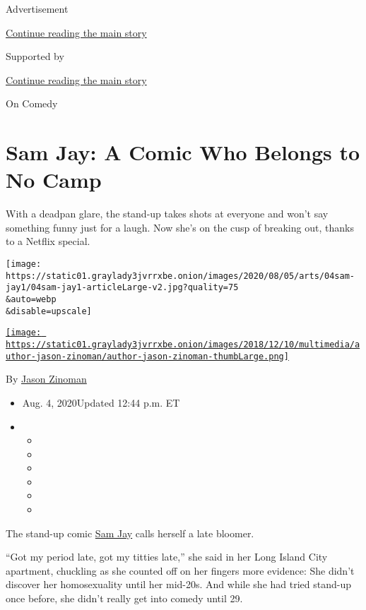 Advertisement

\protect\hyperlink{after-top}{Continue reading the main story}

Supported by

\protect\hyperlink{after-sponsor}{Continue reading the main story}

On Comedy

\hypertarget{sam-jay-a-comic-who-belongs-to-no-camp}{%
\section{Sam Jay: A Comic Who Belongs to No
Camp}\label{sam-jay-a-comic-who-belongs-to-no-camp}}

With a deadpan glare, the stand-up takes shots at everyone and won't say
something funny just for a laugh. Now she's on the cusp of breaking out,
thanks to a Netflix special.

\texttt{[image: https://static01.graylady3jvrrxbe.onion/images/2020/08/05/arts/04sam-jay1/04sam-jay1-articleLarge-v2.jpg?quality=75\\\&auto=webp\\\&disable=upscale]}

\href{https://www.nytimes3xbfgragh.onion/by/jason-zinoman}{\texttt{[image: https://static01.graylady3jvrrxbe.onion/images/2018/12/10/multimedia/author-jason-zinoman/author-jason-zinoman-thumbLarge.png]}}

By \href{https://www.nytimes3xbfgragh.onion/by/jason-zinoman}{Jason
Zinoman}

\begin{itemize}
\item
  Aug. 4, 2020Updated 12:44 p.m. ET
\item
  \begin{itemize}
  \item
  \item
  \item
  \item
  \item
  \item
  \end{itemize}
\end{itemize}

The stand-up comic \href{https://samjaycomic.com/}{Sam Jay} calls
herself a late bloomer.

``Got my period late, got my titties late,'' she said in her Long Island
City apartment, chuckling as she counted off on her fingers more
evidence: She didn't discover her homosexuality until her mid-20s. And
while she had tried stand-up once before, she didn't really get into
comedy until 29.

